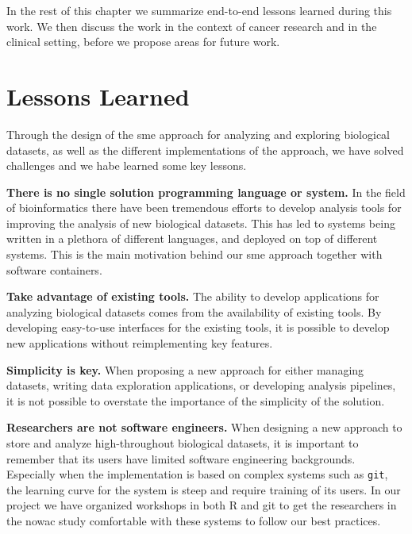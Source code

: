 In the rest of this chapter we summarize end-to-end lessons learned during this
work. We then discuss the work in the context of cancer research and in the
clinical setting, before we propose areas for future work. 


\section{Lessons Learned}
Through the design of the \gls{sme} approach for analyzing and exploring
biological datasets, as well as the different implementations of the approach,
we have solved challenges and we habe learned some key lessons.

\textbf{There is no single solution programming language or system.} 
In the field of bioinformatics there have been tremendous efforts to develop
analysis tools for improving the analysis of new biological datasets.  This has
led to systems being written in a plethora of different languages, and deployed
on top of different systems. This is the main motivation behind our \gls{sme}
approach together with software containers.

\textbf{Take advantage of existing tools.} The ability to develop applications
for analyzing biological datasets comes from the availability of existing tools.
By developing easy-to-use interfaces for the existing tools, it is possible
to develop new applications without reimplementing key features. 

\textbf{Simplicity is key.} When proposing a new approach for either managing
datasets, writing data exploration applications, or developing analysis
pipelines, it is not possible to overstate the importance of the simplicity of
the solution. 

\textbf{Researchers are not software engineers.} 
When designing a new approach to store and analyze high-throughout biological
datasets, it is important to remember that its users have limited software
engineering backgrounds. Especially when the implementation is based on complex
systems such as \texttt{git}, the learning curve for the system is steep and
require training of its users. In our project we have organized workshops in
both R and git to get the researchers in the \gls{nowac} study comfortable with
these systems to follow our best practices. 




